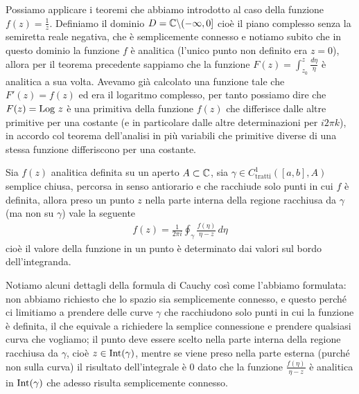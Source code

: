 Possiamo applicare i teoremi che abbiamo introdotto al caso della funzione $ f(z) = \frac1z $. Definiamo il dominio $ D = \mathbb{C} \backslash (-\infty, 0] $ cioè il 
piano complesso senza la semiretta reale negativa, che è semplicemente connesso e notiamo subito che in questo dominio la funzione $ f $ è 
analitica (l'unico punto non definito era $ z = 0 $), allora per il teorema precedente sappiamo che la funzione 
$ F(z) = \int_{z_0}^{z} \frac{d\eta}{\eta} $ è analitica a sua volta. Avevamo già calcolato una funzione tale che $ F'(z) = f(z) $ ed era il logaritmo 
complesso, per tanto possiamo dire che $ F(z) = \textnormal{Log } z $ è una primitiva della funzione $ f(z) $ che differisce dalle altre primitive per una costante 
(e in particolare dalle altre determinazioni per $ i2\pi k $), in accordo col teorema dell'analisi in più variabili che primitive diverse di una 
stessa funzione differiscono per una costante.

\begin{theorem} \label{thm: formula di Cauchy}
  Sia $ f(z)  $ analitica definita su un aperto $ A \subset \mathbb{C} $, sia $ \gamma \in C^1_{\text{tratti}}([a,b], A) $ semplice chiusa, 
  percorsa in senso antiorario e che racchiude solo punti in cui $ f $ è definita, 
  allora preso un punto $ z $ nella parte interna della regione racchiusa da $ \gamma $ (ma non su $ \gamma $) vale la seguente
  \begin{align}
    f(z) = \frac1{2\pi i} \oint_\gamma \frac{f(\eta)}{\eta - z} \,d\eta
  \end{align}
  cioè il valore della funzione in un punto è determinato dai valori sul bordo dell'integranda.
\end{theorem}
Notiamo alcuni dettagli della formula di Cauchy così come l'abbiamo formulata: non abbiamo richiesto che lo spazio sia semplicemente connesso, e questo 
perché ci limitiamo a prendere delle curve $ \gamma $ che racchiudono solo punti in cui la funzione è definita, il che equivale a richiedere la semplice 
connessione e prendere qualsiasi curva che vogliamo; il punto deve essere scelto nella parte interna della regione racchiusa da $ \gamma $, cioè 
$ z \in \textnormal{Int}(\gamma) $, mentre se viene preso nella parte esterna (purché non sulla curva) il risultato dell'integrale è $ 0 $ dato che la 
funzione $ \frac{f(\eta)}{\eta - z} $ è analitica in $ \textnormal{Int}(\gamma) $ che adesso risulta semplicemente connesso.

